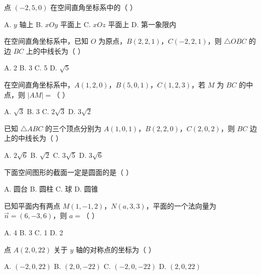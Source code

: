 \documentclass[11pt, a4paper]{article}
\begin{document}
\begin{baitap}[7]
点 $(-2, 5, 0)$ 在空间直角坐标系中的（ ）
\par\vspace{3pt}
\noindent A. $y$ 轴上 \quad B. $xOy$ 平面上 \quad C. $xOz$ 平面上 \quad D. 第一象限内
\end{baitap}

\begin{baitap}[8]
在空间直角坐标系中，已知 $O$ 为原点，$B(2,2,1)$，$C(-2,2,1)$，则 $\triangle OBC$ 的边 $BC$ 上的中线长为（ ）
\par\vspace{3pt}
\noindent A. 2 \quad B. 3 \quad C. 5 \quad D. $\sqrt{5}$
\end{baitap}

\begin{baitap}[9]
在空间直角坐标系中，$A(1,2,0)$，$B(5,0,1)$，$C(1,2,3)$，若 $M$ 为 $BC$ 的中点，则 $\lvert AM \rvert =$（ ）
\par\vspace{3pt}
\noindent A. $\sqrt{3}$ \quad B. 3 \quad C. $2\sqrt{3}$ \quad D. $3\sqrt{2}$
\end{baitap}

\begin{baitap}[10]
已知 $\triangle ABC$ 的三个顶点分别为 $A(1,0,1)$，$B(2,2,0)$，$C(2,0,2)$，则 $BC$ 边上的中线长为（ ）
\par\vspace{3pt}
\noindent A. $2\sqrt{6}$ \quad B. $\sqrt{2}$ \quad C. $3\sqrt{5}$ \quad D. $3\sqrt{6}$
\end{baitap}

\begin{baitap}[11]
下面空间图形的截面一定是圆面的是（ ）
\par\vspace{3pt}
\noindent A. 圆台 \quad B. 圆柱 \quad C. 球 \quad D. 圆锥
\end{baitap}

\begin{baitap}[12]
已知平面内有两点 $M(1,-1,2)$，$N(a,3,3)$，平面的一个法向量为 $\vec{n} = (6,-3,6)$，则 $a =$（ ）
\par\vspace{3pt}
\noindent A. 4 \quad B. 3 \quad C. 1 \quad D. 2
\end{baitap}

\begin{baitap}[13]
点 $A(2,0,22)$ 关于 $y$ 轴的对称点的坐标为（ ）
\par\vspace{3pt}
\noindent A. $(-2,0,22)$ \quad B. $(2,0,-22)$ \quad C. $(-2,0,-22)$ \quad D. $(2,0,22)$
\end{baitap}
\end{document}
